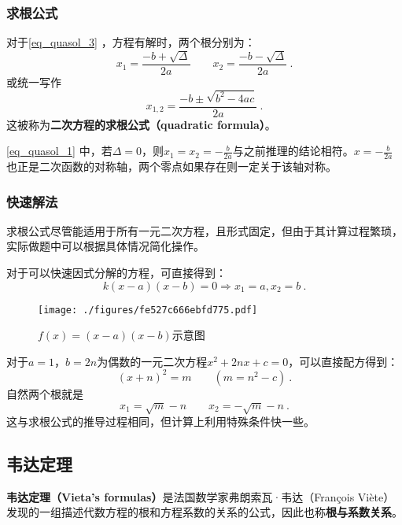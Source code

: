 \subsubsection{求根公式}

对于\autoref{eq_quasol_3} ，方程有解时，两个根分别为：
\begin{equation}\label{eq_quasol_1}
x_1=\frac{-b+\sqrt{\Delta}}{2a}\qquad x_2=\frac{-b-\sqrt{\Delta}}{2a}~.
\end{equation}
或统一写作
\begin{equation}
x_{1,2} = \frac{-b \pm \sqrt{b^2 - 4ac}}{2a}~.
\end{equation}
这被称为\textbf{二次方程的求根公式（quadratic formula）}。

\autoref{eq_quasol_1} 中，若$\Delta = 0$，则$\displaystyle x_1=x_2=-\frac{b}{2a}$与之前推理的结论相符。$\displaystyle x=-\frac{b}{2a}$也正是二次函数的对称轴，两个零点如果存在则一定关于该轴对称。


\subsubsection{快速解法}

求根公式尽管能适用于所有一元二次方程，且形式固定，但由于其计算过程繁琐，实际做题中可以根据具体情况简化操作。

对于可以快速因式分解的方程，可直接得到：
$$k(x-a)(x-b)=0\Rightarrow x_1=a, x_2=b~.$$
\begin{figure}[ht]
\centering
\texttt{[image: ./figures/fe527c666ebfd775.pdf]}
\caption{$f(x)=(x-a)(x-b)$示意图} \label{fig_quasol_2}
\end{figure}

对于$a=1$，$b=2n$为偶数的一元二次方程$x^2+2nx+c=0$，可以直接配方得到：
\begin{equation}
(x+n)^2=m\qquad(m=n^2-c)~.
\end{equation}
自然两个根就是
\begin{equation}
x_1=\sqrt{m}-n\qquad x_2=-\sqrt{m}-n~.
\end{equation}
这与求根公式的推导过程相同，但计算上利用特殊条件快一些。

\subsection{韦达定理}

\textbf{韦达定理（Vieta's formulas）}是法国数学家弗朗索瓦·韦达（François Viète）发现的一组描述代数方程的根和方程系数的关系的公式，因此也称\textbf{根与系数关系}。

